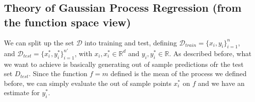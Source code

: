 \subsection{Theory of Gaussian Process Regression (from the function space view)}

We can split up the set $\mathcal{D}$ into training and test, defining $\mathcal{D}_{train} = \{ x_i , y_i \}_{i=1}^n$, and $\mathcal{D}_{test} = \{ x^*_i , y^*_i \}_{i=1}^{n'}$, with $x_i, x^*_i \in \mathbb{R}^d$ and $y_i, y^*_i \in \mathbb{R}$. As described before, what we want to achieve is basically generating out of sample predictions ofr the test set $D_{test}$. Since the function $f = m$ defined is the mean of the process we defined before, we can simply evaluate the out of sample points $x_i^*$ on $f$ and we have an estimate for $y_i^*$.

 

